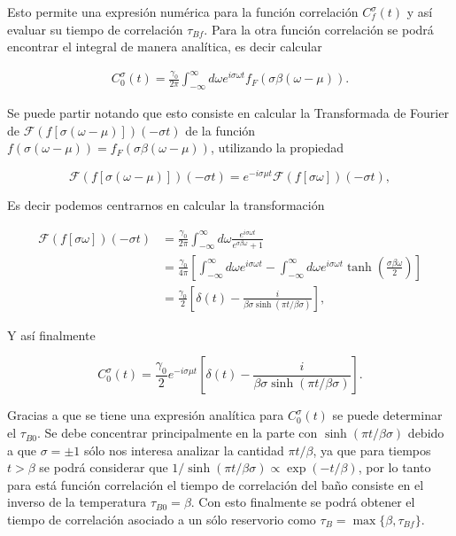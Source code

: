 \begin{appendixs}
Esto permite una expresión numérica para la función correlación $C^{\sigma}_{f}(t)$ y así evaluar su tiempo de correlación $\tau_{Bf}$. Para la otra función correlación se podrá encontrar el integral de manera analítica, es decir calcular

\begin{align*}
       C_{0}^{\sigma}(t) = \frac{\gamma_{0}}{2\pi} \int_{-\infty}^{\infty} d\omega e^{i\sigma \omega t }f_{F}(\sigma \beta (\omega -  \mu)).
\end{align*}    

Se puede partir notando que esto consiste en calcular la Transformada de Fourier de $\mathcal{F}(f[\sigma (\omega - \mu)])(-\sigma t)$ de la función $f(\sigma(\omega-\mu))= f_{F}(\sigma \beta (\omega-\mu) )$, utilizando la propiedad

\begin{equation*}
\mathcal{F}(f[\sigma (\omega - \mu)])(-\sigma t) = e^{-i \sigma \mu t}\mathcal{F}(f[\sigma \omega])(-\sigma t),
\end{equation*}

Es decir podemos centrarnos en calcular la transformación

\begin{align*}
    \mathcal{F}(f[\sigma \omega])(-\sigma t) &= \frac{\gamma_{0}}{2\pi} \int_{-\infty}^{\infty} d\omega \frac{e^{i\sigma \omega t}}{e^{\sigma \beta \omega} +1 } \\
        & = \frac{\gamma_{0}}{4\pi} \left[\int_{-\infty}^{\infty}d \omega e^{i\sigma \omega t} - \int_{-\infty}^{\infty}d\omega e^{i\sigma \omega t} \tanh \left(\frac{ \sigma \beta \omega }{2} \right)   \right] \\
        & =  \frac{\gamma_{0}}{2} \left[\delta(t) - \frac{i}{\beta \sigma \sinh(\pi t/\beta \sigma)} \right],
\end{align*}

Y así finalmente

\begin{equation*}
    C^{\sigma}_{0}(t) = \frac{\gamma_{0}}{2}e^{-i\sigma \mu t} \left[\delta(t) - \frac{i}{\beta \sigma \sinh(\pi t/\beta \sigma)} \right].
\end{equation*}

Gracias a que se tiene una expresión analítica para $C^{\sigma}_{0}(t)$ se puede determinar el $\tau_{B0}$. Se debe concentrar principalmente en la parte con $\sinh(\pi t/\beta \sigma)$ debido a que $\sigma=\pm 1$ sólo nos interesa analizar la cantidad $\pi t/\beta$, ya que para tiempos $t > \beta$ se podrá considerar que $1/\sinh(\pi t/\beta \sigma) \propto \exp(-t/\beta)$, por lo tanto para está función correlación el tiempo de correlación del baño consiste en el inverso de la temperatura $\tau_{B0} = \beta$. Con esto finalmente se podrá obtener el tiempo de correlación asociado a un sólo reservorio como $\tau_{B} = \max \{\beta,\tau_{Bf} \}$.  


\end{appendixs}
